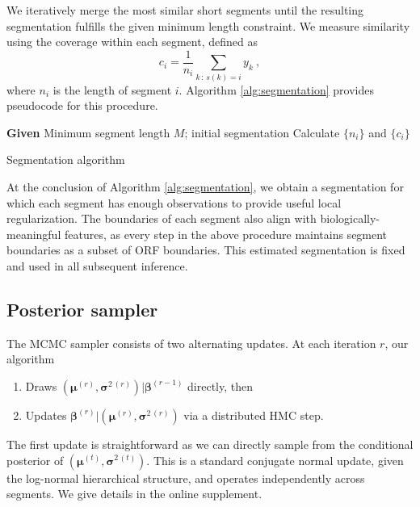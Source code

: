 We iteratively merge the most similar short segments until the resulting segmentation fulfills the given minimum length constraint.
We measure similarity using the coverage within each segment, defined as
\begin{equation}
 c_i = \frac{1}{n_i} \sum_{k \,:\, s(k)=i} y_k \ ,
\end{equation}
where $n_i$ is the length of segment $i$.
Algorithm \ref{alg:segmentation} provides pseudocode for this procedure.

\begin{algorithm}
  \textbf{Given} Minimum segment length $M$; initial segmentation\;
  Calculate $\{n_i\}$ and $\{c_i\}$\;
  \medskip
  \caption{Segmentation algorithm \label{alg:segmentation}}
\end{algorithm}

At the conclusion of Algorithm \ref{alg:segmentation}, we obtain a segmentation for which each segment has enough observations to provide useful local regularization.
The boundaries of each segment also align with biologically-meaningful features, as every step in the above procedure maintains segment boundaries as a subset of ORF boundaries.
This estimated segmentation is fixed and used in all subsequent inference.

\subsection{Posterior sampler}
\label{sec:mcmc}

The MCMC sampler consists of two alternating updates.
At each iteration $r$, our algorithm
\begin{enumerate}
 \item Draws $(\bm \mu^{(r)}, \bm \sigma^{2\,(r)}) | \bm \beta^{(r-1)}$ directly, then
 \item Updates $\bm \beta^{(r)} | (\bm \mu^{(r)}, \bm \sigma^{2\,(r)})$ via a distributed HMC step.
\end{enumerate}
The first update is straightforward as we can directly sample from the conditional posterior of $(\bm \mu^{(t)}, \bm \sigma^{2\,(t)})$.
This is a standard conjugate normal update, given the log-normal hierarchical structure, and operates independently across segments.
We give details in the online supplement. %

